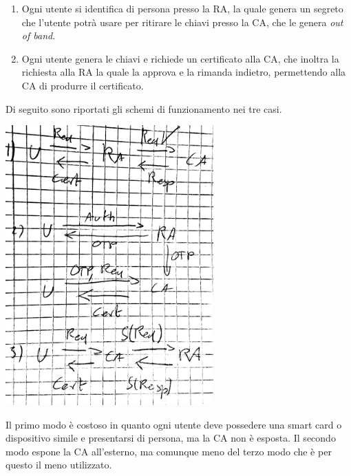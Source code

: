 \documentclass[answers, a4paper, 11pt]{exam}
\begin{document}
\begin{questions}
\begin{parts}
\begin{solution}
\begin{enumerate}
\item Ogni utente si identifica di persona presso la RA, la quale genera un segreto che l'utente potrà usare per ritirare le chiavi presso la CA, che le genera \textit{out of band}.
\item Ogni utente genera le chiavi e richiede un certificato alla CA, che inoltra la richiesta alla RA la quale la approva e la rimanda indietro, permettendo alla CA di produrre il certificato.
\end{enumerate}
Di seguito sono riportati gli schemi di funzionamento nei tre casi.

\includegraphics[width=0.6\textwidth]{certauth}

Il primo modo è costoso in quanto ogni utente deve possedere una smart card o dispositivo simile e presentarsi di persona, ma la CA non è esposta.
Il secondo modo espone la CA all'esterno, ma comunque meno del terzo modo che è per questo il meno utilizzato.
\end{solution}

\end{parts}
\end{questions}
\end{document}
